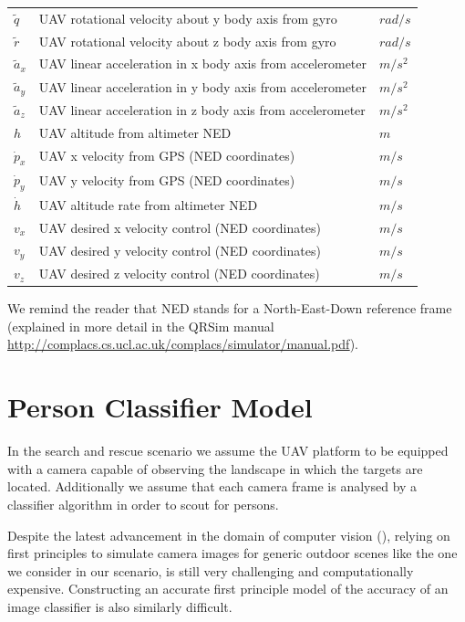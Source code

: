 \documentclass[a4paper,11pt]{report}
\newcommand{\sname}{QRSim\xspace}
\newcommand{\webman}{\url{http://complacs.cs.ucl.ac.uk/complacs/simulator/manual.pdf}\xspace}
\begin{document}
\begin{table}[ht]
\begin{tabular}{l l l}
     $\tilde{q}$  & UAV rotational velocity about y body axis from gyro                 & $rad/s$\\ 
     $\tilde{r}$  & UAV rotational velocity about z body axis from gyro                & $rad/s$\\
     $\tilde{a}_x$ & UAV linear acceleration in x body axis from accelerometer            & $m/s^2$\\
     $\tilde{a}_y$ & UAV linear acceleration in y body axis from accelerometer             & $m/s^2$\\
     $\tilde{a}_z$ & UAV linear acceleration in z body axis from accelerometer             & $m/s^2$\\
     $h$& UAV altitude from altimeter NED & $m$\\
     $\dot{p}_x$ & UAV x velocity from GPS (NED coordinates)            & $m/s$\\
     $\dot{p}_y$ & UAV y velocity from GPS (NED coordinates)            & $m/s$\\
     $\dot{h}$    & UAV altitude rate from altimeter NED                   & $m/s$\\
     $v_x$ & UAV desired x velocity control (NED coordinates)            & $m/s$\\ 
     $v_y$ & UAV desired y velocity control (NED coordinates)            & $m/s$\\ 
     $v_z$ & UAV desired z velocity control (NED coordinates)            & $m/s$\\
\end{tabular}
\end{table}

We remind the reader that NED stands for a North-East-Down reference frame (explained in more detail in the \sname manual \webman).

\section{Person Classifier Model} \label{personclassifier}

In the search and rescue scenario we assume the UAV platform to be equipped with a camera capable of observing the landscape in which the targets are located. Additionally we assume that each camera frame is analysed by a classifier algorithm in order to scout for persons. 

Despite the latest advancement in the domain of computer vision (\cite{handa2012}), relying on first principles to simulate camera images for generic outdoor scenes like the one we consider in our scenario, is still very challenging and computationally expensive. Constructing an accurate first principle model of the accuracy of an image classifier is also similarly difficult.
\end{document}
